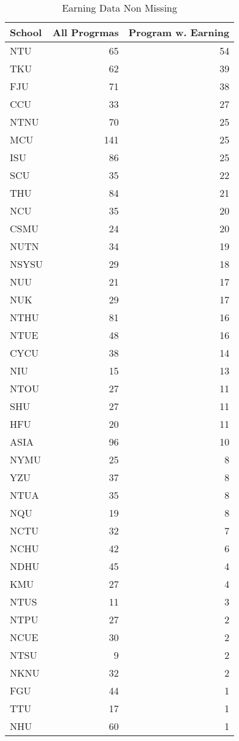 
\begin{longtable}[t]{lrr}
\caption{Earning Data Non Missing}\\
\toprule
School & All Progrmas & Program w. Earning\\
\midrule
NTU & 65 & 54\\
TKU & 62 & 39\\
FJU & 71 & 38\\
CCU & 33 & 27\\
NTNU & 70 & 25\\
\addlinespace
MCU & 141 & 25\\
ISU & 86 & 25\\
SCU & 35 & 22\\
THU & 84 & 21\\
NCU & 35 & 20\\
\addlinespace
CSMU & 24 & 20\\
NUTN & 34 & 19\\
NSYSU & 29 & 18\\
NUU & 21 & 17\\
NUK & 29 & 17\\
\addlinespace
NTHU & 81 & 16\\
NTUE & 48 & 16\\
CYCU & 38 & 14\\
NIU & 15 & 13\\
NTOU & 27 & 11\\
\addlinespace
SHU & 27 & 11\\
HFU & 20 & 11\\
ASIA & 96 & 10\\
NYMU & 25 & 8\\
YZU & 37 & 8\\
\addlinespace
NTUA & 35 & 8\\
NQU & 19 & 8\\
NCTU & 32 & 7\\
NCHU & 42 & 6\\
NDHU & 45 & 4\\
\addlinespace
KMU & 27 & 4\\
NTUS & 11 & 3\\
NTPU & 27 & 2\\
NCUE & 30 & 2\\
NTSU & 9 & 2\\
\addlinespace
NKNU & 32 & 2\\
FGU & 44 & 1\\
TTU & 17 & 1\\
NHU & 60 & 1\\
\bottomrule
\end{longtable}
